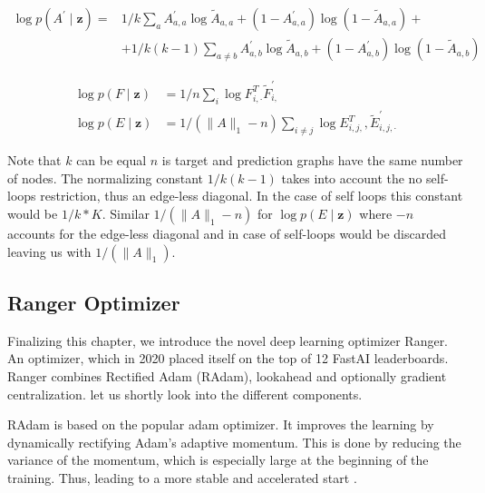 \begin{equation}
    \label{eq3:GAVElossA}
    \begin{split}
        \log p\left(A^{\prime} \mid \mathbf{z}\right) = &1 / k \sum_{a} A_{a, a}^{\prime} \log \widetilde{A}_{a, a}+\left(1-A_{a, a}^{\prime}\right) \log \left(1-\widetilde{A}_{a, a}\right)+ \\ & +1 / k(k-1) \sum_{a \neq b} A_{a, b}^{\prime} \log \widetilde{A}_{a, b}+\left(1-A_{a, b}^{\prime}\right) \log \left(1-\widetilde{A}_{a, b}\right)
    \end{split}
\end{equation}

\begin{align}
    \label{eq3:GAVElossEF}
        \log p(F \mid \mathbf{z}) &=1 / n \sum_{i} \log F_{i, \cdot}^{T} \widetilde{F}_{i,}^{\prime} \\
        \log p(E \mid \mathbf{z}) &=1 /\left(\|A\|_{1}-n\right) \sum_{i \neq j} \log E_{i, j,}^{T}, \widetilde{E}_{i, j, \cdot}^{\prime}
\end{align}

Note that $k$ can be equal $n$ is target and prediction graphs have the same number of nodes. The normalizing constant $1 / k(k-1)$ takes into account the no self-loops restriction, thus an edge-less diagonal. In the case of self loops this constant would be $1 / k*K$. Similar $1 /\left(\|A\|_{1}-n\right)$ for $\log p(E \mid \mathbf{z})$ where $-n$ accounts for the edge-less diagonal and in case of self-loops would be discarded leaving us with $1 /\left(\|A\|_{1}\right)$.

\subsection{Ranger Optimizer}
\label{sec3:ranger}

Finalizing this chapter, we introduce the novel deep learning optimizer Ranger. An optimizer, which in 2020 placed itself on the top of 12 FastAI leaderboards. Ranger combines Rectified Adam (RAdam), lookahead and optionally gradient centralization. let us shortly look into the different components.

RAdam is based on the popular adam optimizer. It improves the learning by dynamically rectifying Adam's adaptive momentum. This is done by reducing the variance of the momentum, which is especially large at the beginning of the training. Thus, leading to a more stable and accelerated start \cite{liu_variance_2020}.

